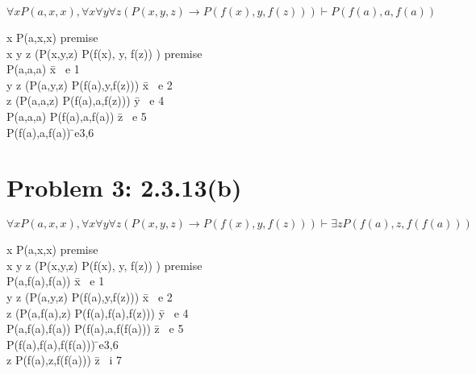 \documentclass[11pt,leqno,fleqn]{article}
\newcommand{\Intro}[1]{{#1}{\textrm{i}}}
\newcommand{\Elim}[1]{{#1}{\textrm{e}}}
\begin{document}
 $\forall x P(a,x,x), \forall x \forall y \forall z (P(x,y,z) \to P(f(x), y, f(z)) ) \vdash P(f(a),a,f(a)) $

\begin{proofbox}
   \label{d1}\: \forall x P(a,x,x) \= \textrm{premise} \\
   \label{d2}\: \forall x \forall y \forall z (P(x,y,z) \to P(f(x), y, f(z)) ) \= \textrm{premise} \\  
    \label{d3}\:  P(a,a,a) \= \Elim {\forall x \ } 1\\
    \label{d4}\: \forall y \forall z (P(a,y,z) \to P(f(a),y,f(z))) \= \Elim  {\forall x \ } 2\\
     \label{d5}\: \forall z (P(a,a,z) \to P(f(a),a,f(z))) \= \Elim  {\forall y \ } 4\\
       \label{d5}\: P(a,a,a) \to P(f(a),a,f(a)) \= \Elim  {\forall z \ } 5\\
         \label{d5}\: P(f(a),a,f(a)) \= \Elim \to 3,6\\
\end{proofbox}


\section{Problem 3: 2.3.13(b) }

 $\forall x P(a,x,x), \forall x \forall y \forall z (P(x,y,z) \to P(f(x), y, f(z)) ) \vdash \exists z P(f(a),z,f(f(a))) $

\begin{proofbox}
   \label{d1}\: \forall x P(a,x,x) \= \textrm{premise} \\
   \label{d2}\: \forall x \forall y \forall z (P(x,y,z) \to P(f(x), y, f(z)) ) \= \textrm{premise} \\  
    \label{d3}\:  P(a,f(a),f(a)) \= \Elim {\forall x \ } 1\\
    \label{d4}\: \forall y \forall z (P(a,y,z) \to P(f(a),y,f(z))) \= \Elim  {\forall x \ } 2\\
     \label{d5}\: \forall z (P(a,f(a),z) \to P(f(a),f(a),f(z))) \= \Elim  {\forall y \ } 4\\
       \label{d5}\: P(a,f(a),f(a)) \to P(f(a),a,f(f(a))) \= \Elim  {\forall z \ } 5\\
         \label{d5}\: P(f(a),f(a),f(f(a))) \= \Elim \to 3,6\\
          \label{d5}\: \exists z P(f(a),z,f(f(a))) \= \Intro {\exists z \ } 7 \\        
\end{proofbox}
\end{document}
